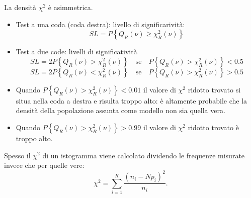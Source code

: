La densità $\chi^2$ è asimmetrica.
\begin{itemize}
\item Test a una coda (coda destra): livello di significarività:
\begin{equation}
SL=P\left\{ { Q }_{ R }\left( \nu  \right)\ge { \chi  }_{ R }^{ 2 }\left( \nu  \right)  \right\} 
\end{equation}
\item Test a due code: livelli di significatività
\begin{equation}
SL=2P\left\{ { Q }_{ R }\left( \nu  \right) >{ \chi  }_{ R }^{ 2 }\left( \nu  \right)  \right\} \quad \textrm{se}\quad P\left\{ { Q }_{ R }\left( \nu  \right) >{ \chi  }_{ R }^{ 2 }\left( \nu  \right)  \right\} <0.5
\end{equation}
\begin{equation}
SL=2P\left\{ { Q }_{ R }\left( \nu  \right) <{ \chi  }_{ R }^{ 2 }\left( \nu  \right)  \right\} \quad \textrm{se}\quad P\left\{ { Q }_{ R }\left( \nu  \right) >{ \chi  }_{ R }^{ 2 }\left( \nu  \right)  \right\} >0.5
\end{equation}
\item Quando $P\left\{ { Q }_{ R }\left( \nu  \right)> { \chi  }_{ R }^{ 2 }\left( \nu  \right)  \right\} <0.01$ il valore di $\chi^2$ ridotto trovato si situa nella coda a destra e risulta troppo alto: è altamente probabile che la densità della popolazione assunta come modello non sia quella vera.
\item Quando $P\left\{ { Q }_{ R }\left( \nu  \right)> { \chi  }_{ R }^{ 2 }\left( \nu  \right)  \right\} >0.99$ il valore di $\chi^2$ ridotto trovato è troppo alto.
\end{itemize}

Spesso il $\chi^2$ di un istogramma viene calcolato dividendo le frequenze misurate invece che per quelle vere:
\begin{equation}
{ \chi  }^{ 2 }=\sum _{ i=1 }^{ K }{ \frac { { \left( { n }_{ i }-N{ p }_{ i } \right)  }^{ 2 } }{ { n }_{ i } }  } .
\end{equation}